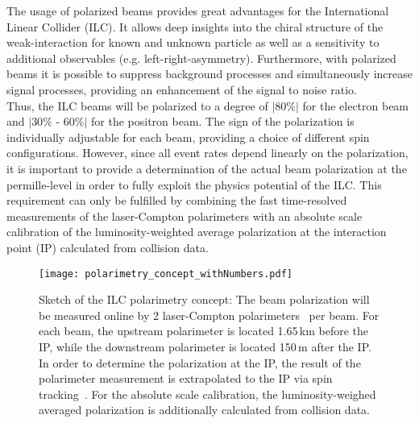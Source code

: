 \documentclass[a4paper]{article}
\begin{document}
The usage of polarized beams provides great advantages for the International Linear Collider (ILC). It allows deep insights into the chiral structure of the weak-interaction for known and unknown particle as well as a sensitivity to additional observables (e.g. left-right-asymmetry). Furthermore, with polarized beams it is possible to suppress background processes and simultaneously increase signal processes, providing an enhancement of the signal to noise ratio.\\
Thus, the ILC\cite{ILCProjectVol1} beams will be polarized to a degree of $\left|80\%\right|$ for the electron beam and $\left|30\%\text{ - }60\%\right|$ for the positron beam. The sign of the polarization is individually adjustable for each beam, providing a choice of different spin configurations. However, since all event rates depend linearly on the polarization, it is important to provide a determination of the actual beam polarization at the permille-level in order to fully exploit the physics potential of the ILC\cite{PolarizationRequirement}. This requirement can only be fulfilled by combining the fast time-resolved measurements of the laser-Compton polarimeters with an absolute scale calibration of the luminosity-weighted average polarization at the interaction point (IP) calculated from collision data.
\begin{figure}[htbp]
\texttt{[image: polarimetry\_concept\_withNumbers.pdf]}
\caption{
Sketch of the ILC polarimetry concept:  The beam polarization will be measured online by 2 laser-Compton polarimeters~\cite{polarimeter} per beam. For each beam, the upstream polarimeter is located 1.65\,km before the IP, while the downstream polarimeter is located 150\,m after the IP.  In order to determine the polarization at the IP, the result of the polarimeter measurement is extrapolated to the IP via spin tracking~\cite{spintracking}.  For the absolute scale calibration, the luminosity-weighed averaged polarization is additionally calculated from collision data.
}
\label{fig:PolarimeterConcept}
\end{figure}
\end{document}
